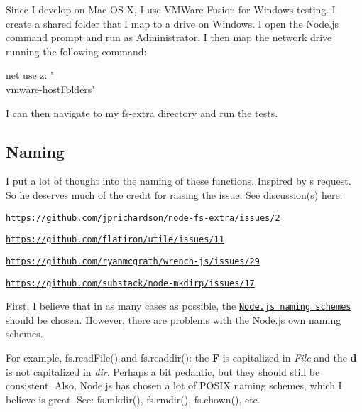 Since I develop on Mac OS X, I use V\+M\+Ware Fusion for Windows testing. I create a shared folder that I map to a drive on Windows. I open the {\ttfamily Node.\+js command prompt} and run as {\ttfamily Administrator}. I then map the network drive running the following command\+: \begin{DoxyVerb}net use z: "\\vmware-host\Shared Folders"
\end{DoxyVerb}


I can then navigate to my {\ttfamily fs-\/extra} directory and run the tests.

\subsection*{Naming }

I put a lot of thought into the naming of these functions. Inspired by \textquotesingle{}s request. So he deserves much of the credit for raising the issue. See discussion(s) here\+:


\begin{DoxyItemize}
\item \href{https://github.com/jprichardson/node-fs-extra/issues/2}{\tt https\+://github.\+com/jprichardson/node-\/fs-\/extra/issues/2}
\item \href{https://github.com/flatiron/utile/issues/11}{\tt https\+://github.\+com/flatiron/utile/issues/11}
\item \href{https://github.com/ryanmcgrath/wrench-js/issues/29}{\tt https\+://github.\+com/ryanmcgrath/wrench-\/js/issues/29}
\item \href{https://github.com/substack/node-mkdirp/issues/17}{\tt https\+://github.\+com/substack/node-\/mkdirp/issues/17}
\end{DoxyItemize}

First, I believe that in as many cases as possible, the \href{http://nodejs.org/api/fs.html}{\tt Node.\+js naming schemes} should be chosen. However, there are problems with the Node.\+js own naming schemes.

For example, {\ttfamily fs.\+read\+File()} and {\ttfamily fs.\+readdir()}\+: the {\bfseries F} is capitalized in {\itshape File} and the {\bfseries d} is not capitalized in {\itshape dir}. Perhaps a bit pedantic, but they should still be consistent. Also, Node.\+js has chosen a lot of P\+O\+S\+IX naming schemes, which I believe is great. See\+: {\ttfamily fs.\+mkdir()}, {\ttfamily fs.\+rmdir()}, {\ttfamily fs.\+chown()}, etc.


